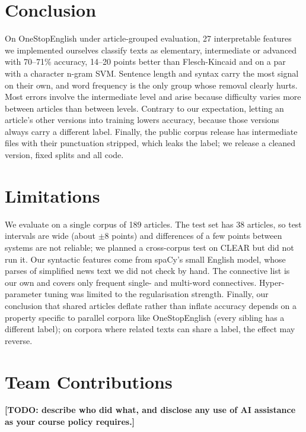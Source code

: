 \section{Conclusion}

On OneStopEnglish under article-grouped evaluation, 27 interpretable features we implemented ourselves classify texts as elementary, intermediate or advanced with 70--71\% accuracy, 14--20 points better than Flesch-Kincaid and on a par with a character n-gram SVM. Sentence length and syntax carry the most signal on their own, and word frequency is the only group whose removal clearly hurts. Most errors involve the intermediate level and arise because difficulty varies more between articles than between levels. Contrary to our expectation, letting an article's other versions into training lowers accuracy, because those versions always carry a different label. Finally, the public corpus release has intermediate files with their punctuation stripped, which leaks the label; we release a cleaned version, fixed splits and all code.

\section*{Limitations}

We evaluate on a single corpus of 189 articles. The test set has 38 articles, so test intervals are wide (about $\pm$8 points) and differences of a few points between systems are not reliable; we planned a cross-corpus test on CLEAR \citep{crossley2023clear} but did not run it. Our syntactic features come from spaCy's small English model, whose parses of simplified news text we did not check by hand. The connective list is our own and covers only frequent single- and multi-word connectives. Hyper-parameter tuning was limited to the regularisation strength. Finally, our conclusion that shared articles deflate rather than inflate accuracy depends on a property specific to parallel corpora like OneStopEnglish (every sibling has a different label); on corpora where related texts can share a label, the effect may reverse.

\section*{Team Contributions}

\textbf{[TODO: describe who did what, and disclose any use of AI assistance as your course policy requires.]}
